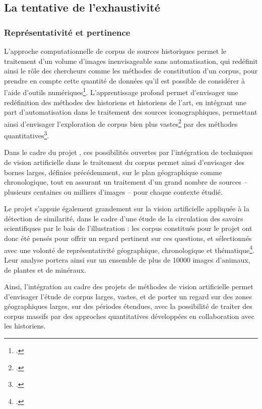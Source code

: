 
\subsection{La tentative de l’exhaustivité}
    \subsubsection{Représentativité et pertinence}
L'approche computationnelle de corpus de sources historiques permet le traitement d'un volume d'images inenvisageable sans automatisation, qui redéfinit ainsi le rôle des chercheurs comme les méthodes de constitution d'un corpus, pour prendre en compte cette quantité de données qu'il est possible de considérer à l'aide d'outils numériques\footcite{klinkeBigImageData2016}. L'apprentissage profond permet d'envisager une redéfinition des méthodes des historiens et historiens de l'art, en intégrant une part d'automatisation dans le traitement des sources iconographiques, permettant ainsi d'envisager l'exploration de corpus bien plus vastes\footcite{moiraghiExplorerCorpusImages2018} par des méthodes quantitatives\footcite{klinkeBigImageData2016}.

Dans le cadre du projet \eida, ces possibilités ouvertes par l'intégration de techniques de vision artificielle dans le traitement du corpus permet ainsi d'envisager des bornes larges, définies précédemment, sur le plan géographique comme chronologique, tout en assurant un traitement d'un grand nombre de sources -- plusieurs centaines ou milliers d'images -- pour chaque contexte étudié. 

Le projet \vhs s'appuie également grandement sur la vision artificielle appliquée à la détection de similarité, dans le cadre d'une étude de la circulation des savoirs scientifiques par le bais de l'illustration : les corpus constitués pour le projet ont donc été pensés pour offrir un regard pertinent sur ces questions, et sélectionnés avec une volonté de représentativité géographique, chronologique et thématique\footcite{Corpus}. Leur analyse portera ainsi sur un ensemble de plus de 10000 images d'animaux, de plantes et de minéraux.

Ainsi, l'intégration au cadre des projets de méthodes de vision artificielle permet d'envisager l'étude de corpus larges, vastes, et de porter un regard sur des zones géographiques larges, sur des périodes étendues, avec la possibilité de traiter des corpus massifs par des approches quantitatives développées en collaboration avec les historiens.


